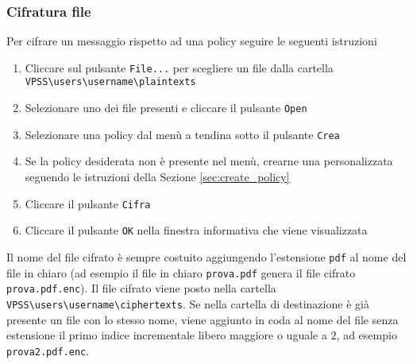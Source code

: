\documentclass[a4paper,twoside,10pt,openany]{scrbook}
\begin{document}
\subsubsection{Cifratura file}\label{sec:enc_file}
%
Per cifrare un messaggio rispetto ad una policy seguire le seguenti istruzioni
\begin{enumerate}
 \item Cliccare sul pulsante \texttt{File...} per scegliere un file dalla cartella\\
       \texttt{VPSS\textbackslash users\textbackslash username\textbackslash plaintexts}
 \item Selezionare uno dei file presenti e cliccare il pulsante \texttt{Open}
 \item Selezionare una policy dal menù a tendina sotto il pulsante \texttt{Crea}
 \item Se la policy desiderata non è presente nel menù, crearne una personalizzata seguendo le istruzioni della Sezione \ref{sec:create_policy}
 \item Cliccare il pulsante \texttt{Cifra}
 \item Cliccare il pulsante \texttt{OK} nella finestra informativa che viene visualizzata
\end{enumerate}
Il nome del file cifrato è sempre costuito aggiungendo l'estensione \texttt{pdf} al nome del file in chiaro (ad esempio il file in chiaro \texttt{prova.pdf} genera il file cifrato \texttt{prova.pdf.enc}). Il file cifrato viene posto nella cartella \texttt{VPSS\textbackslash users\textbackslash username\textbackslash ciphertexts}.
Se nella cartella di destinazione è già presente un file con lo stesso nome, viene aggiunto in coda al nome del file senza estensione il primo indice incrementale libero maggiore o uguale a 2, ad esempio \texttt{prova2.pdf.enc}.
%
\end{document}

